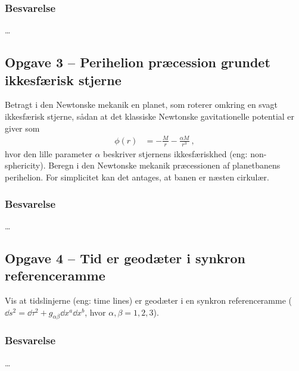 \documentclass[../main.tex]{subfiles}
\begin{document}

\subsubsection*{Besvarelse}

\ldots




\subsection{Opgave 3 -- Perihelion præcession grundet ikkesfærisk stjerne}
\setcounter{subsection}{3}
\setcounter{equation}{0}

Betragt i den Newtonske mekanik en planet, som roterer omkring en svagt ikkesfærisk stjerne, sådan at det klassiske Newtonske gavitationelle potential er giver som
\begin{align}
    \phi(r) &= - \frac{M}{r} - \frac{\alpha M}{r^3} \: ,
\end{align}
hvor den lille parameter $\alpha$ beskriver stjernens ikkesfæriskhed (eng: non-sphericity). Beregn i den Newtonske mekanik præcessionen af planetbanens perihelion. For simplicitet kan det antages, at banen er næsten cirkulær.


\subsubsection*{Besvarelse}

\ldots




\subsection{Opgave 4 -- Tid er geodæter i synkron referenceramme}
\setcounter{subsection}{4}
\setcounter{equation}{0}

Vis at tidslinjerne (eng: time lines) er geodæter i en synkron referenceramme ($\dd s^2 = \dd \tau^2 + g_{\alpha\beta} \dd x^a \dd x^b$, hvor $\alpha,\beta = 1,2,3$).


\subsubsection*{Besvarelse}

\ldots



\end{document}
